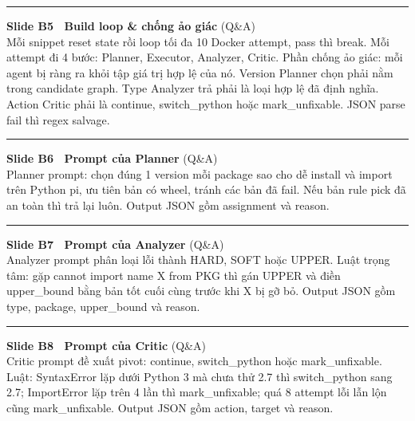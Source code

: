 \documentclass[11pt]{article}
\newcommand{\slidehead}[3]{%
  \vspace{1.05em}\par\noindent
  {\color{accent}\rule[-0.18em]{3pt}{1.05em}}\hspace{0.5em}%
  {\bfseries\large\color{navydeep}Slide #1 \textperiodcentered\ #2}%
  \hfill{\small\color{gray}(#3)}\\[0.25em]%
}
\begin{document}
\slidehead{B5}{Build loop \& chống ảo giác}{Q\&A}
Mỗi snippet reset state rồi loop tối đa 10 Docker attempt, pass thì break. Mỗi attempt đi 4 bước: Planner, Executor, Analyzer, Critic. Phần chống ảo giác: mỗi agent bị ràng ra khỏi tập giá trị hợp lệ của nó. Version Planner chọn phải nằm trong candidate graph. Type Analyzer trả phải là loại hợp lệ đã định nghĩa. Action Critic phải là continue, switch\_python hoặc mark\_unfixable. JSON parse fail thì regex salvage.

\slidehead{B6}{Prompt của Planner}{Q\&A}
Planner prompt: chọn đúng 1 version mỗi package sao cho dễ install và import trên Python pi, ưu tiên bản có wheel, tránh các bản đã fail. Nếu bản rule pick đã an toàn thì trả lại luôn. Output JSON gồm assignment và reason.

\slidehead{B7}{Prompt của Analyzer}{Q\&A}
Analyzer prompt phân loại lỗi thành HARD, SOFT hoặc UPPER. Luật trọng tâm: gặp cannot import name X from PKG thì gán UPPER và điền upper\_bound bằng bản tốt cuối cùng trước khi X bị gỡ bỏ. Output JSON gồm type, package, upper\_bound và reason.

\slidehead{B8}{Prompt của Critic}{Q\&A}
Critic prompt đề xuất pivot: continue, switch\_python hoặc mark\_unfixable. Luật: SyntaxError lặp dưới Python 3 mà chưa thử 2.7 thì switch\_python sang 2.7; ImportError lặp trên 4 lần thì mark\_unfixable; quá 8 attempt lỗi lẫn lộn cũng mark\_unfixable. Output JSON gồm action, target và reason.
\end{document}
